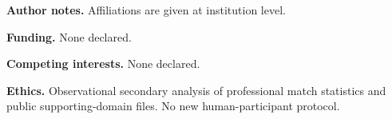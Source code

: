 \documentclass[12pt,letterpaper]{article}
\begin{document}
\noindent\textbf{Author notes.} Affiliations are given at institution level.

\noindent\textbf{Funding.} None declared.

\noindent\textbf{Competing interests.} None declared.

\noindent\textbf{Ethics.} Observational secondary analysis of professional match statistics and public supporting-domain files. No new human-participant protocol.
\end{document}
